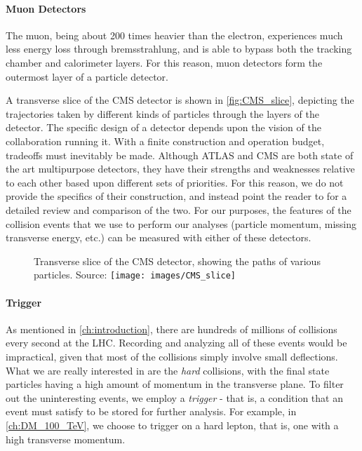 \paragraph{Muon Detectors} The muon, being about 200 times heavier than the electron, experiences much less energy loss through bremsstrahlung, and is able to bypass both the tracking chamber and calorimeter layers. For this reason, muon detectors form the outermost layer of a particle detector.

A transverse slice of the CMS detector is shown in \autoref{fig:CMS_slice}, depicting the trajectories taken by different kinds of particles through the layers of the detector.
The specific design of a detector depends upon the vision of the collaboration running it. With a finite construction and operation budget, tradeoffs must inevitably be made. Although ATLAS and CMS are both state of the art multipurpose detectors, they have their strengths and weaknesses relative to each other based upon different sets of priorities. For this reason, we do not provide the specifics of their construction, and instead point the reader to \citep{Froidevaux2006} for a detailed review and comparison of the two.
For our purposes, the features of the collision events that we use to perform our analyses (particle momentum, missing transverse energy, etc.) can be measured with either of these detectors.
\begin{figure}[h]
  \begin{sidecaption}
    {Transverse slice of the CMS detector, showing the paths of various particles. Source: \citep{CMS_Slice}}
    \centering
    \texttt{[image: images/CMS\_slice]}
  \end{sidecaption}
  \label{fig:CMS_slice}
\end{figure}
\paragraph{Trigger} As mentioned in \autoref{ch:introduction}, there are hundreds of millions of collisions every second at the LHC. Recording and analyzing all of these events would be impractical, given that most of the collisions simply involve small deflections. What we are really interested in are the \emph{hard} collisions, with the final state particles having a high amount of momentum in the transverse plane. To filter out the uninteresting events, we employ a \emph{trigger} - that is, a condition that an event must satisfy to be stored for further analysis. For example, in \autoref{ch:DM_100_TeV}, we choose to trigger on a hard lepton, that is, one with a high transverse momentum.
